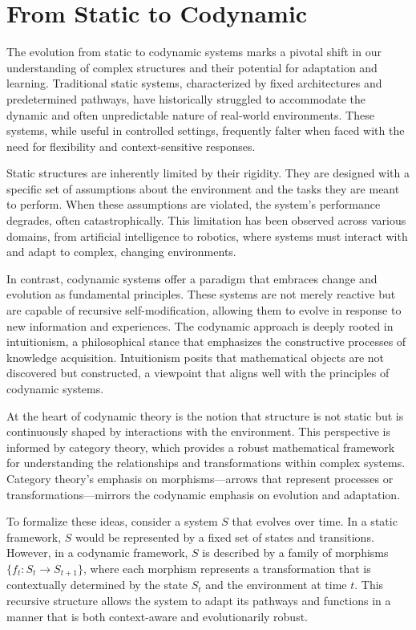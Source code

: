 \section{From Static to Codynamic}

The evolution from static to codynamic systems marks a pivotal shift in our understanding of complex structures and their potential for adaptation and learning. Traditional static systems, characterized by fixed architectures and predetermined pathways, have historically struggled to accommodate the dynamic and often unpredictable nature of real-world environments. These systems, while useful in controlled settings, frequently falter when faced with the need for flexibility and context-sensitive responses.

Static structures are inherently limited by their rigidity. They are designed with a specific set of assumptions about the environment and the tasks they are meant to perform. When these assumptions are violated, the system's performance degrades, often catastrophically. This limitation has been observed across various domains, from artificial intelligence to robotics, where systems must interact with and adapt to complex, changing environments.

In contrast, codynamic systems offer a paradigm that embraces change and evolution as fundamental principles. These systems are not merely reactive but are capable of recursive self-modification, allowing them to evolve in response to new information and experiences. The codynamic approach is deeply rooted in intuitionism, a philosophical stance that emphasizes the constructive processes of knowledge acquisition. Intuitionism posits that mathematical objects are not discovered but constructed, a viewpoint that aligns well with the principles of codynamic systems.

At the heart of codynamic theory is the notion that structure is not static but is continuously shaped by interactions with the environment. This perspective is informed by category theory, which provides a robust mathematical framework for understanding the relationships and transformations within complex systems. Category theory's emphasis on morphisms—arrows that represent processes or transformations—mirrors the codynamic emphasis on evolution and adaptation.

To formalize these ideas, consider a system \( S \) that evolves over time. In a static framework, \( S \) would be represented by a fixed set of states and transitions. However, in a codynamic framework, \( S \) is described by a family of morphisms \( \{ f_t : S_t \to S_{t+1} \} \), where each morphism represents a transformation that is contextually determined by the state \( S_t \) and the environment at time \( t \). This recursive structure allows the system to adapt its pathways and functions in a manner that is both context-aware and evolutionarily robust.

